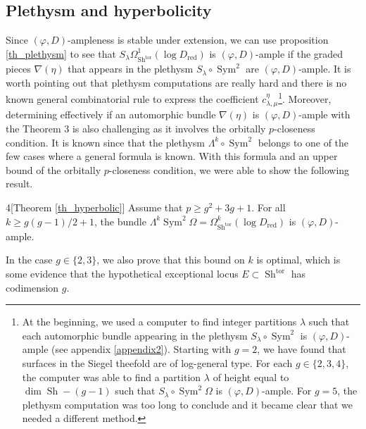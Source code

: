 \documentclass[11pt]{amsart}
\numberwithin{subsection}{section}
\numberwithin{figure}{section}
\numberwithin{table}{section}
\theoremstyle{1}
\theoremstyle{2}
\DeclareMathOperator{\Sh}{Sh}
\DeclareMathOperator{\Sym}{Sym}
\DeclareMathOperator{\tor}{tor}
\DeclareMathOperator{\red}{red}
\begin{document}
\subsection{Plethysm and hyperbolicity}
Since $(\varphi,D)$-ampleness is stable under extension, we can use proposition \ref{th_plethysm} to see that $S_{\lambda}\Omega^1_{\Sh^{\tor}}(\log D_{\red})$ is $(\varphi,D)$-ample if the graded pieces $\nabla(\eta)$ that appears in the plethysm $S_{\lambda} \circ \Sym^2$ are $(\varphi,D)$-ample. It is worth pointing out that plethysm computations are really hard and there is no known general combinatorial rule to express the coefficient $c^{\eta}_{\lambda,\mu}$\footnote{At the beginning, we used a computer to find integer partitions $\lambda$ such that each automorphic bundle appearing in the plethysm $S_{\lambda} \circ \Sym^2$ is $(\varphi,D)$-ample (see appendix \ref{appendix2}). Starting with $g=2$, we have found that surfaces in the Siegel theefold are of log-general type. For each $g \in \{2,3,4\}$, the computer was able to find a partition $\lambda$ of height equal to $\dim \Sh - (g-1)$ such that $S_{\lambda} \circ \Sym^2 \Omega$ is $(\varphi,D)$-ample. For $g = 5$, the plethysm computation was too long to conclude and it became clear that we needed a different method.}. Moreover, determining effectively if an automorphic bundle $\nabla(\eta)$ is $(\varphi,D)$-ample with the Theorem 3 is also challenging as it involves the orbitally $p$-closeness condition. It is known since {\cite[Lemma 7]{MR2497590}} that the plethysm $\Lambda^k \circ \Sym^2$ belongs to one of the few cases where a general formula is known. With this formula and an upper bound of the orbitally $p$-closeness condition, we were able to show the following result. 
\begin{customthm}{4}[Theorem \ref{th_hyperbolic}]
Assume that $p \geq g^2+3g+1$. For all $k \geq g(g-1)/2+1$, the bundle $\Lambda^k\Sym^2\Omega = \Omega^k_{\Sh^{\tor}}(\log D_{\red})$ is $(\varphi,D)$-ample.
\end{customthm}
\vspace{0.2cm} 
In the case $g\in \{2,3\}$, we also prove that this bound on $k$ is optimal, which is some evidence that the hypothetical exceptional locus $E \subset \Sh^{\tor}$ has codimension $g$. 
\end{document}
